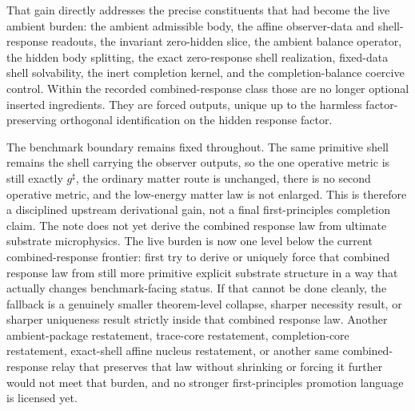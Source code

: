 \documentclass[11pt]{article}
\newcommand{\CompletedMetric}{g^{\sharp}}
\begin{document}
That gain directly addresses the precise constituents that had become the live ambient burden: the ambient admissible body, the affine observer-data and shell-response readouts, the invariant zero-hidden slice, the ambient balance operator, the hidden body splitting, the exact zero-response shell realization, fixed-data shell solvability, the inert completion kernel, and the completion-balance coercive control. Within the recorded combined-response class those are no longer optional inserted ingredients. They are forced outputs, unique up to the harmless factor-preserving orthogonal identification on the hidden response factor.

The benchmark boundary remains fixed throughout. The same primitive shell remains the shell carrying the observer outputs, so the one operative metric is still exactly \(\CompletedMetric\), the ordinary matter route is unchanged, there is no second operative metric, and the low-energy matter law is not enlarged. This is therefore a disciplined upstream derivational gain, not a final first-principles completion claim. The note does not yet derive the combined response law from ultimate substrate microphysics. The live burden is now one level below the current combined-response frontier: first try to derive or uniquely force that combined response law from still more primitive explicit substrate structure in a way that actually changes benchmark-facing status. If that cannot be done cleanly, the fallback is a genuinely smaller theorem-level collapse, sharper necessity result, or sharper uniqueness result strictly inside that combined response law. Another ambient-package restatement, trace-core restatement, completion-core restatement, exact-shell affine nucleus restatement, or another same combined-response relay that preserves that law without shrinking or forcing it further would not meet that burden, and no stronger first-principles promotion language is licensed yet.
\end{document}
